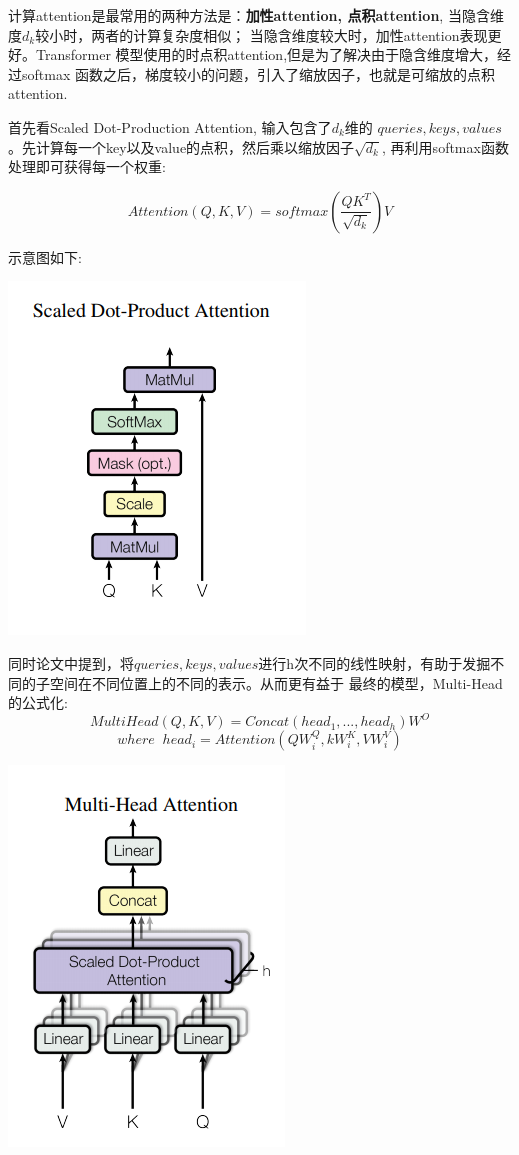 \documentclass[UTF8,a4paper,10pt]{ctexart}
\begin{document}
计算attention是最常用的两种方法是：\textbf{加性attention, 点积attention}, 当隐含维度$d_k$较小时，两者的计算复杂度相似；
当隐含维度较大时，加性attention表现更好。Transformer 模型使用的时点积attention,但是为了解决由于隐含维度增大，经过softmax
函数之后，梯度较小的问题，引入了缩放因子，也就是可缩放的点积attention.

首先看Scaled Dot-Production Attention, 输入包含了$d_k$维的 $queries, keys, values$。先计算每一个key以及value的点积，然后乘以缩放因子$\sqrt{d_k}$, 
再利用softmax函数处理即可获得每一个权重:

$$
	Attention(Q, K, V) = softmax(\frac{QK^T}{\sqrt{d_k}})V
$$

示意图如下:
\\
\centerline{\includegraphics[scale=0.6]{pics/190601-scal.png}}

  

同时论文中提到，将$queries, keys, values$进行h次不同的线性映射，有助于发掘不同的子空间在不同位置上的不同的表示。从而更有益于
最终的模型，Multi-Head的公式化:
$$
			MultiHead(Q, K, V) = Concat(head_1, ..., head_h)W^O 
$$		
$$
			where \; \; head_i = Attention(QW_i^Q, kW_i^K, VW_i^V)
$$
    \centerline{\includegraphics[scale=0.6]{pics/190601-multi.png}}
\end{document}
